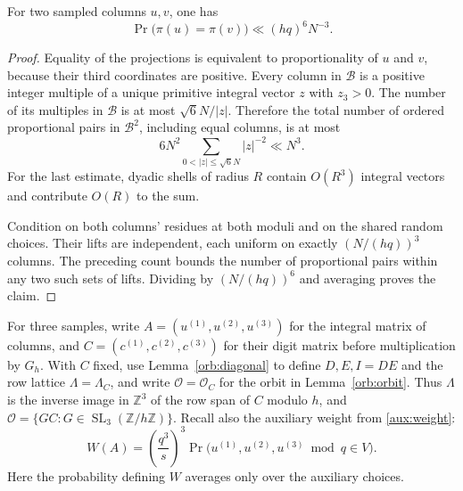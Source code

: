 \begin{lemma}\label{sam:proportional}
For two sampled columns $u,v$, one has
\begin{equation}\label{sam:pair-bound}
 \Pr\bigl(\pi(u)=\pi(v)\bigr)\ll (hq)^6N^{-3}.
\end{equation}
\end{lemma}
\begin{proof}
Equality of the projections is equivalent to proportionality of $u$ and
$v$, because their third coordinates are positive.  Every column in
$\mathcal B$ is a positive integer multiple of a unique primitive integral
vector $z$ with $z_3>0$.  The number of its multiples in $\mathcal B$ is at
most $\sqrt6N/|z|$.  Therefore the total number of ordered proportional
pairs in $\mathcal B^2$, including equal columns, is at most
\[
 6N^2\sum_{0<|z|\le\sqrt6N}|z|^{-2}\ll N^3.
\]
For the last estimate, dyadic shells of radius $R$ contain $O(R^3)$
integral vectors and contribute $O(R)$ to the sum.

Condition on both columns' residues at both moduli and on the shared
random choices.  Their lifts are independent, each uniform on exactly
$(N/(hq))^3$ columns.  The preceding count bounds the number of
proportional pairs within any two such sets of lifts.  Dividing by
$(N/(hq))^6$ and averaging proves the claim.
\end{proof}

For three samples, write $A=(u^{(1)},u^{(2)},u^{(3)})$ for the integral
matrix of columns, and $C=(c^{(1)},c^{(2)},c^{(3)})$ for their digit matrix
before multiplication by $G_h$.  With $C$ fixed, use
Lemma~\ref{orb:diagonal} to define $D,E,I=DE$ and the row lattice
$\Lambda=\Lambda_C$, and write $\mathcal O=\mathcal O_C$ for the orbit in
Lemma~\ref{orb:orbit}.  Thus $\Lambda$ is the inverse image in $\mathbb Z^3$ of the row
span of $C$ modulo $h$, and
$\mathcal O=\{GC:G\in\operatorname{SL}_3(\mathbb Z/h\mathbb Z)\}$.
Recall also the auxiliary weight from \eqref{aux:weight}:
\[
 W(A)=\left(\frac{q^3}{s}\right)^3
 \Pr\bigl(u^{(1)},u^{(2)},u^{(3)}\bmod q\in V\bigr).
\]
Here the probability defining $W$ averages only over the auxiliary choices.

